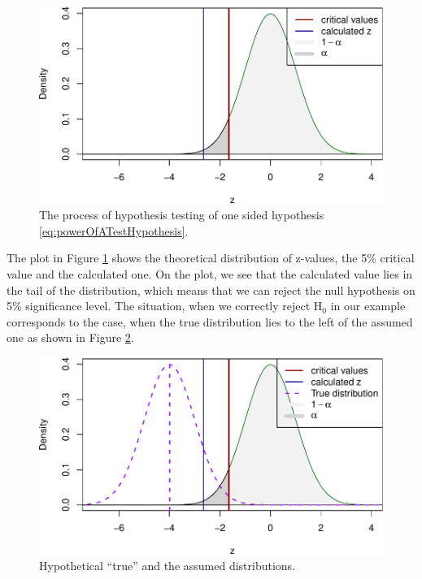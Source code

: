 \documentclass[
]{book}
\theoremstyle{definition}
\theoremstyle{definition}
\theoremstyle{definition}
\theoremstyle{definition}
\theoremstyle{remark}
\begin{document}
\begin{figure}
\centering
\includegraphics{Svetunkov---Statistics-for-Business-Analytics_files/figure-latex/powerOfTestVisual01-1.pdf}
\caption{\label{fig:powerOfTestVisual01}The process of hypothesis testing of one sided hypothesis \eqref{eq:powerOfATestHypothesis}.}
\end{figure}

The plot in Figure \ref{fig:powerOfTestVisual01} shows the theoretical distribution of z-values, the 5\% critical value and the calculated one. On the plot, we see that the calculated value lies in the tail of the distribution, which means that we can reject the null hypothesis on 5\% significance level. The situation, when we correctly reject H\(_0\) in our example corresponds to the case, when the true distribution lies to the left of the assumed one as shown in Figure \ref{fig:powerOfTestVisual02}.

\begin{figure}
\centering
\includegraphics{Svetunkov---Statistics-for-Business-Analytics_files/figure-latex/powerOfTestVisual02-1.pdf}
\caption{\label{fig:powerOfTestVisual02}Hypothetical ``true'' and the assumed distributions.}
\end{figure}
\end{document}
